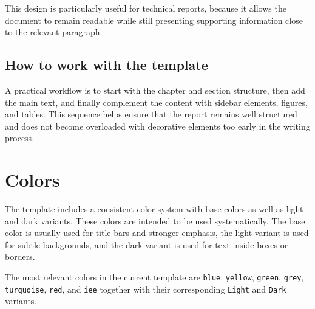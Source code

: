 \documentclass[11pt,a4paper]{report}
\begin{document}
This design is particularly useful for technical reports, because it allows the document to remain readable while still presenting supporting information close to the relevant paragraph.



\section{How to work with the template}

A practical workflow is to start with the chapter and section structure, then add the main text, and finally complement the content with sidebar elements, figures, and tables. This sequence helps ensure that the report remains well structured and does not become overloaded with decorative elements too early in the writing process.

\clearpage

\chapter{Colors}

The template includes a consistent color system with base colors as well as light and dark variants. These colors are intended to be used systematically. The base color is usually used for title bars and stronger emphasis, the light variant is used for subtle backgrounds, and the dark variant is used for text inside boxes or borders.

The most relevant colors in the current template are \texttt{blue}, \texttt{yellow}, \texttt{green}, \texttt{grey}, \texttt{turquoise}, \texttt{red}, and \texttt{iee}  together with their corresponding \texttt{Light} and \texttt{Dark} variants.
\end{document}

